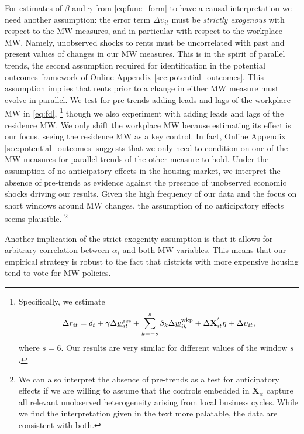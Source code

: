 For estimates of $\beta$ and $\gamma$ from \eqref{eq:func_form} to have a causal 
interpretation we need another assumption: the error term $\Delta\upsilon_{it}$ 
must be \textit{strictly exogenous} with respect to the MW measures, and in 
particular with respect to the workplace MW.
Namely, unobserved shocks to rents must be uncorrelated with past and present 
values of changes in our MW measures.
This is in the spirit of parallel trends, the second assumption required for
identification in the potential outcomes framework of Online Appendix 
\ref{sec:potential_outcomes}.
This assumption implies that rents prior to a change in either MW measure must
evolve in parallel.
We test for pre-trends adding leads and lags of the workplace MW in 
\eqref{eq:fd},%
\footnote{Specifically, we estimate
    \begin{equation*}
        \Delta r_{it} = \delta_t
                    + \gamma \Delta \underline{w}^{\text{res}}_{it} 
                    + \sum_{k=-s}^{s} \beta_k \Delta \underline{w}^{\text{wkp}}_{ik}
                    + \Delta \mathbf{X}^{'}_{it}\eta
                    + \Delta \upsilon_{it} ,
    \end{equation*}
    where $s=6$.
    Our results are very similar for different values of the window $s$.}
though we also experiment with adding leads and lags of the residence MW.
We only shift the workplace MW because estimating its effect is our focus, 
seeing the residence MW as a key control.
In fact, Online Appendix \ref{sec:potential_outcomes} suggests that we 
only need to condition on one of the MW measures for parallel trends of the 
other measure to hold.
Under the assumption of no anticipatory effects in the housing market, we 
interpret the absence of pre-trends as evidence against the presence 
of unobserved economic shocks driving our results.
Given the high frequency of our data and the focus on short windows around 
MW changes, the assumption of no anticipatory effects seems plausible.%
\footnote{We can also interpret the absence of pre-trends as a test for 
    anticipatory effects if we are willing to assume that the controls embedded 
    in $\mathbf{X}_{it}$ capture all relevant unobserved heterogeneity arising 
    from local business cycles.
    While we find the interpretation given in the text more palatable, the data 
    are consistent with both.}

Another implication of the strict exogenity assumption is that it allows for 
arbitrary correlation between $\alpha_i$ and both MW variables.
This means that our empirical strategy is robust to the fact that districts 
with more expensive housing tend to vote for MW policies.

